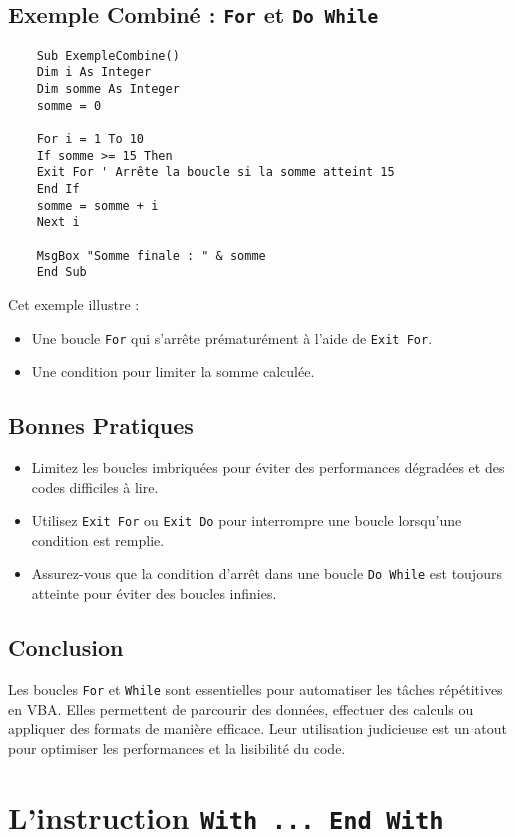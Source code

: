 \documentclass[a4paper,12pt]{report}
\begin{document}
\section{Exemple Combiné : \texttt{For} et \texttt{Do While}}
\begin{lstlisting}
	Sub ExempleCombine()
	Dim i As Integer
	Dim somme As Integer
	somme = 0
	
	For i = 1 To 10
	If somme >= 15 Then
	Exit For ' Arrête la boucle si la somme atteint 15
	End If
	somme = somme + i
	Next i
	
	MsgBox "Somme finale : " & somme
	End Sub
\end{lstlisting}

Cet exemple illustre :
\begin{itemize}
	\item Une boucle \texttt{For} qui s'arrête prématurément à l'aide de \texttt{Exit For}.
	\item Une condition pour limiter la somme calculée.
\end{itemize}

\section{Bonnes Pratiques}
\begin{itemize}
	\item Limitez les boucles imbriquées pour éviter des performances dégradées et des codes difficiles à lire.
	\item Utilisez \texttt{Exit For} ou \texttt{Exit Do} pour interrompre une boucle lorsqu'une condition est remplie.
	\item Assurez-vous que la condition d'arrêt dans une boucle \texttt{Do While} est toujours atteinte pour éviter des boucles infinies.
\end{itemize}

\section{Conclusion}
Les boucles \texttt{For} et \texttt{While} sont essentielles pour automatiser les tâches répétitives en VBA. Elles permettent de parcourir des données, effectuer des calculs ou appliquer des formats de manière efficace. Leur utilisation judicieuse est un atout pour optimiser les performances et la lisibilité du code.



\chapter{L'instruction \texttt{With ... End With}}
\end{document}
